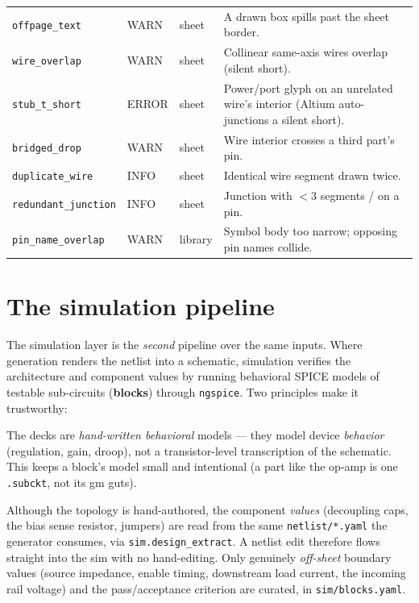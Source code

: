 \documentclass[11pt]{article}
\newcommand{\file}[1]{\texttt{#1}}
\newcommand{\mod}[1]{\texttt{#1}}
\begin{document}
\begin{longtable}{p{} p{} p{} p{}}
\texttt{offpage\_text} & WARN & sheet & A drawn box spills past the sheet border.\\
\texttt{wire\_overlap} & WARN & sheet & Collinear same-axis wires overlap (silent short).\\
\texttt{stub\_t\_short} & ERROR & sheet & Power/port glyph on an unrelated wire's interior (Altium auto-junctions a silent short).\\
\texttt{bridged\_drop} & WARN & sheet & Wire interior crosses a third part's pin.\\
\texttt{duplicate\_wire} & INFO & sheet & Identical wire segment drawn twice.\\
\texttt{redundant\_junction} & INFO & sheet & Junction with $<3$ segments / on a pin.\\
\texttt{pin\_name\_overlap} & WARN & library & Symbol body too narrow; opposing pin names collide.\\
\bottomrule
\end{longtable}

\section{The simulation pipeline}\label{sec:sim}

The simulation layer is the \emph{second} pipeline over the same inputs. Where
generation renders the netlist into a schematic, simulation verifies the
architecture and component values by running behavioral SPICE models of testable
sub-circuits (\textbf{blocks}) through \texttt{ngspice}. Two principles make it
trustworthy:

\begin{description}[leftmargin=1.4em]
  \item[Behavioral, not transcribed.] The decks are \emph{hand-written
    behavioral} models --- they model device \emph{behavior} (regulation, gain,
    droop), not a transistor-level transcription of the schematic. This keeps a
    block's model small and intentional (a part like the op-amp is one
    \texttt{.subckt}, not its gm guts).
  \item[Values from the as-built design.] Although the topology is hand-authored,
    the component \emph{values} (decoupling caps, the bias sense resistor,
    jumpers) are read from the same \file{netlist/*.yaml} the generator consumes,
    via \mod{sim.design\_extract}. A netlist edit therefore flows straight into
    the sim with no hand-editing. Only genuinely \emph{off-sheet} boundary values
    (source impedance, enable timing, downstream load current, the incoming rail
    voltage) and the pass/acceptance criterion are curated, in
    \file{sim/blocks.yaml}.
\end{description}
\end{document}
